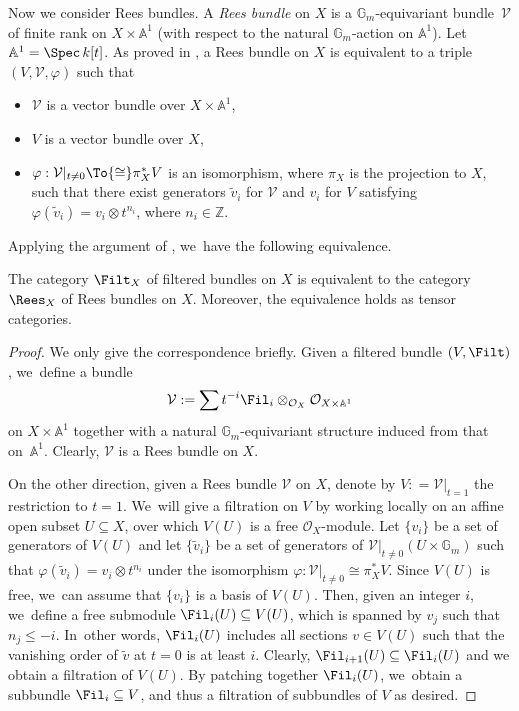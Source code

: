 Now we consider Rees bundles. A \emph{Rees bundle} on $X$ is a $\mathbb{G}_m$-equivariant bundle~$\mathcal{V}$ of finite rank on $X \times \mathbb{A}^1$ (with respect to the natural $\mathbb{G}_m$-action on $\mathbb{A}^1$). Let $\mathbb{A}^1 = \Spec \, k[t]$. As proved in \cite[Lem.\,2.1.3]{Lo17b}, a Rees bundle on $X$ is equivalent to a triple $(V,\mathcal{V},\varphi)$ such that
\begin{itemize}
\item $\mathcal{V}$ is a vector bundle over $X \times \mathbb{A}^1$,
\item $V$ is a vector bundle over $X$,
\item $\varphi: \mathcal{V}|_{t \neq 0} \To{\cong} \pi_X^* V$ is an isomorphism, where $\pi_X$ is the projection to $X$, such that there exist generators $\widetilde{v}_i$ for $\mathcal{V}$ and $v_i$ for $V$ satisfying $\varphi(\widetilde{v}_i) = v_i \otimes t^{n_i}$, where $n_i \in \mathbb{Z}$.
\end{itemize}
Applying the argument of \cite[Prop.\,2.1.5]{Lo17b}, we~have the following equivalence.

\begin{lem}\label{lem_rees_fil}
The category $\Filt_X$ of filtered bundles on $X$ is equivalent to the category $\Rees_X$ of Rees bundles on $X$. Moreover, the equivalence holds as tensor categories.
\end{lem}

\begin{proof}
We only give the correspondence briefly. Given a filtered bundle $(V, \Filt)$, we~define a bundle
\begin{align*}
\mathcal{V}: = \sum t^{-i} \Fil_{i} \otimes_{\mathcal{O}_X} \mathcal{O}_{X \times \mathbb{A}^1}
\end{align*}
on $X \times \mathbb{A}^1$ together with a natural $\mathbb{G}_m$-equivariant structure induced from that on~$\mathbb{A}^1$. Clearly, $\mathcal{V}$ is a Rees bundle on $X$.

On the other direction, given a Rees bundle $\mathcal{V}$ on $X$, denote by $V: = \mathcal{V}|_{t = 1}$ the restriction to $t=1$. We~will give a filtration on $V$ by working locally on an affine open subset $U \subseteq X$, over which $V(U)$ is a free $\mathcal{O}_X$-module. Let $\{v_i\}$ be a set of generators of $V(U)$ and let $\{\widetilde{v}_i\}$ be a set of generators of $\mathcal{V}|_{t \neq 0} (U \times \mathbb{G}_m)$ such that $\varphi(\widetilde{v}_i) = v_i \otimes t^{n_i}$ under the isomorphism $\varphi: \mathcal{V}|_{t \neq 0} \cong \pi^*_X V$. Since $V(U)$ is free, we~can assume that $\{v_i\}$ is a basis of $V(U)$. Then, given an integer $i$, we~define a free submodule $\Fil_i(U) \subseteq V(U)$, which is spanned by $v_j$ such that $n_j \leq -i$. In~other words, $\Fil_i(U)$ includes all sections $v \in V(U)$ such that the vanishing order of $\widetilde{v}$ at $t=0$ is at least $i$. Clearly, $\Fil_{i+1}(U) \subseteq \Fil_{i}(U)$ and we obtain a filtration of $V(U)$. By patching together $\Fil_i(U)$, we~obtain a subbundle $\Fil_i \subseteq V$, and thus a filtration of subbundles of $V$ as desired.
\end{proof}

